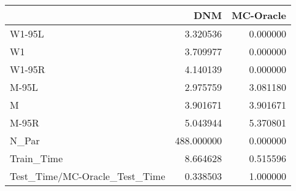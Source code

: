 \begin{tabular}{lrr}
\toprule
{} &         DNM &  MC-Oracle \\
\midrule
W1-95L                        &    3.320536 &   0.000000 \\
W1                            &    3.709977 &   0.000000 \\
W1-95R                        &    4.140139 &   0.000000 \\
M-95L                         &    2.975759 &   3.081180 \\
M                             &    3.901671 &   3.901671 \\
M-95R                         &    5.043944 &   5.370801 \\
N\_Par                         &  488.000000 &   0.000000 \\
Train\_Time                    &    8.664628 &   0.515596 \\
Test\_Time/MC-Oracle\_Test\_Time &    0.338503 &   1.000000 \\
\bottomrule
\end{tabular}
